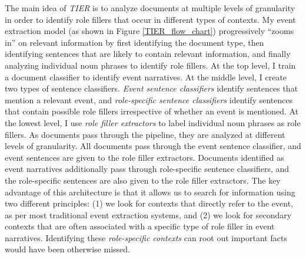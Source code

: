 The main idea of {\it TIER} 
is to analyze documents at multiple
levels of granularity in order to identify role fillers that occur in
different types of contexts. My event extraction model (as shown in Figure \ref{TIER_flow_chart}) progressively
``zooms in'' on relevant information by first identifying the document
type, then identifying sentences that are likely to contain relevant
information, and finally analyzing individual noun phrases to identify
role fillers. At the top level, I train a 
document classifier to identify event
narratives. At the middle level, I create two types of
sentence classifiers.  {\it Event sentence classifiers} identify
sentences that mention a relevant event, 
and {\it
  role-specific sentence classifiers} identify sentences that contain
possible role fillers irrespective of whether an event is
mentioned. At the lowest level, I use {\it role filler extractors} to
label individual noun phrases as role fillers. 
As documents
pass through the pipeline, they are analyzed at different
levels of granularity. All documents pass
through the event sentence classifier, and event sentences
are given to the role filler extractors. Documents
identified as event narratives additionally pass
through role-specific sentence classifiers, and the
role-specific sentences are also given to the role filler
extractors.
The key advantage of this architecture is that it allows
us to search for information using two different principles: (1) we
look for contexts that directly refer to the event, as per most
traditional event extraction systems, and (2) we look for secondary
contexts that are often associated with a specific type of role
filler in event narratives. Identifying these {\it role-specific contexts} can root out
important facts would have been otherwise missed. 


